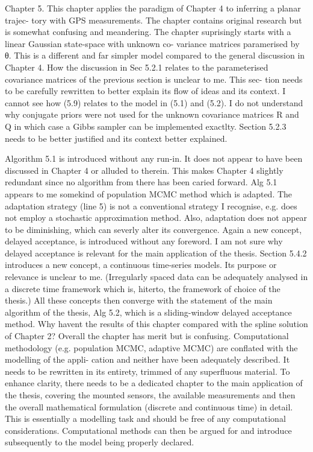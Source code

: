 \documentclass[a4paper,18pt]{extarticle}
\begin{document}
Chapter 5. This chapter applies the paradigm of Chapter 4 to inferring a planar trajec- tory with GPS measurements. The chapter contains original research but is somewhat confusing and meandering. 
The chapter suprisingly starts with a linear Gaussian state-space with unknown co- variance matrices paramerised by θ. This is a different and far simpler model compared to the general discussion in Chapter 4. How the discussion in Sec 5.2.1 relates to the parameterised covariance matrices of the previous section is unclear to me. This sec- tion needs to be carefully rewritten to better explain its flow of ideas and its context. I cannot see how (5.9) relates to the model in (5.1) and (5.2). I do not understand why conjugate priors were not used for the unknown covariance matrices R and Q in which case a Gibbs sampler can be implemented exactlty. Section 5.2.3 needs to be better justified and its context better explained. 

Algorithm 5.1 is introduced without any run-in. It does not appear to have been discussed in Chapter 4 or alluded to therein. This makes Chapter 4 slightly redundant since no algorithm from there has been caried forward. Alg 5.1 appears to me somekind of population MCMC method which is adapted. The adaptation strategy (line 5) is not a conventional strategy I recognise, e.g. does not employ a stochastic approximation method. Also, adaptation does not appear to be diminishing, which can severly alter its convergence. Again a new concept, delayed acceptance, is introduced without any foreword. I am not sure why delayed acceptance is relevant for the main application of the thesis. Section 5.4.2 introduces a new concept, a continuous time-series models. Its purpose or relevance is unclear to me. (Irregularly spaced data can be adequately analysed in a discrete time framework which is, hiterto, the framework of choice of the thesis.) All these concepts then converge with the statement of the main algorithm of the thesis, Alg 5.2, which is a sliding-window delayed acceptance method. Why havent the results of this chapter compared with the spline solution of Chapter 2? 
Overall the chapter has merit but is confusing. Computational methodology (e.g. population MCMC, adaptive MCMC) are conflated with the modelling of the appli- cation and neither have been adequately described. It needs to be rewritten in its entirety, trimmed of any superfluous material. To enhance clarity, there needs to be a dedicated chapter to the main application of the thesis, covering the mounted sensors, the available measurements and then the overall mathematical formulation (discrete and continuous time) in detail. This is essentially a modelling task and should be free 
of any computational considerations. Computational methods can then be argued for and introduce subsequently to the model being properly declared. 
\end{document}
